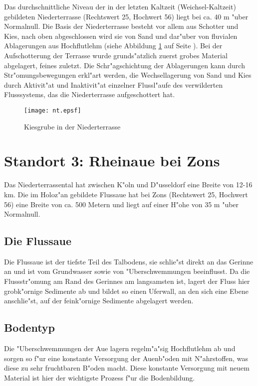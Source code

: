 \documentclass[titlepage,a4paper]{article}
\begin{document}
    Das durchschnittliche Niveau der in der letzten Kaltzeit (Weichsel-Kaltzeit) gebildeten Niederterrasse (Rechtswert 25, Hochwert 56) liegt bei ca. 40 m "uber Normalnull. Die Basis der Niederterrasse besteht vor allem aus Schotter und Kies, nach oben abgeschlossen wird sie von Sand und dar"uber von fluvialen Ablagerungen aus Hochflutlehm (siehe Abbildung \ref{nt1} auf Seite \pageref{nt1}). Bei der Aufschotterung der Terrasse wurde grunds"atzlich zuerst grobes Material abgelagert, feines zuletzt. Die Schr"agschichtung der Ablagerungen kann durch Str"omungsbewegungen erkl"art werden, die Wechsellagerung von Sand und Kies durch Aktivit"at und Inaktivit"at einzelner Flussl"aufe des verwilderten Flusssystems, das die Niederterrasse aufgeschottert hat.
    
\begin{figure}
\begin{center}
\texttt{[image: nt.epsf]}
\end{center}
\caption{Kiesgrube in der Niederterrasse} \label{nt1}
\end{figure}


\section{Standort 3: Rheinaue bei Zons}

    Das Niederterrassental hat zwischen K"oln und D"usseldorf eine Breite von 12-16 km. Die im Holoz"an gebildete Flussaue hat bei Zons (Rechtswert 25, Hochwert 56) eine Breite von ca. 500 Metern und liegt auf einer H"ohe von 35 m "uber Normalnull. 
            
    \subsection{Die Flussaue}
        Die Flussaue ist der tiefste Teil des Talbodens, sie schlie"st direkt an das Gerinne an und ist vom Grundwasser sowie von "Uberschwemmungen beeinflusst. Da die Flussstr"omung am Rand des Gerinnes am langsamsten ist, lagert der Fluss hier grobk"ornige Sedimente ab und bildet so einen Uferwall, an den sich eine Ebene anschlie"st, auf der feink"ornige Sedimente abgelagert werden.
                 
    \subsection{Bodentyp}
    
    Die "Uberschwemmungen der Aue lagern regelm"a"sig Hochflutlehm ab und sorgen so f"ur eine konstante Versorgung der Auenb"oden mit N"ahrstoffen, was diese zu sehr fruchtbaren B"oden macht. Diese konstante Versorgung mit neuem Material ist hier der wichtigste Prozess f"ur die Bodenbildung.
        
\end{document}

